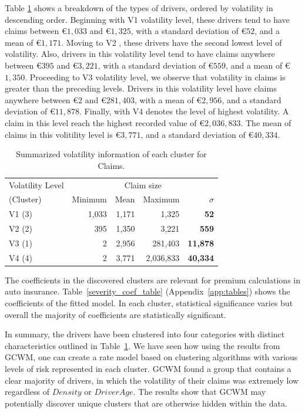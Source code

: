 \documentclass[12pt,letterpaper]{article}
\numberwithin{equation}{section}
\numberwithin{equation}{section}
\numberwithin{equation}{section}
\begin{document}
Table \ref{table:volSev} shows a breakdown of the types of drivers, ordered by volatility in descending order. Beginning with V1 volatility level, these drivers tend to have claims between \euro$1,033$ and  \euro$1,325$, with a standard deviation of  \euro$52$, and a mean of  \euro$1,171$. Moving to V2 , these drivers have the second lowest level of volatility. Also, drivers in this volatility level tend to have claims anywhere between  \euro$395$ and  \euro$3,221$, with a standard deviation of  \euro$559$, and a mean of  \euro$1,350$.  Proceeding to V3 volatility level, we observe that volatility in claims is greater than the preceding levels. Drivers in this volatility level have claims anywhere between  \euro$2$ and \euro$281,403$, with a mean of  \euro$2,956$, and a standard deviation of  \euro$11,878$. Finally, with V4 denotes the level of highest volatility. A claim in this level reach the highest recorded value of  \euro$2,036,833$. The mean of  claims in this volitility level is \euro$3,771$, and a standard deviation of  \euro$40,334$. 
\begin{table}[!htb]
\centering
\caption{Summarized volatility information of each cluster for Claims.}
\label{table:volSev}
\begin{tabular}{l|rrrr}
\hline
Volatility Level     & \multicolumn{4}{c}{Claim size}   \\ 
 (Cluster)     & Minimum & Mean  & Maximum & $\sigma$    \\
\hline
V1 (3) & 1,033 & 1,171 & 1,325 & \textbf{52} \\
V2 (2) & 395 & 1,350 & 3,221 & \textbf{559} \\
V3 (1) & 2 & 2,956 & 281,403 & \textbf{11,878 }\\
V4 (4) & 2 & 3,771 & 2,036,833 & \textbf{ 40,334 } \\ 
\hline
\end{tabular}
\end{table}


The coefficients in the discovered clusters are relevant for premium calculations in auto insurance. Table~\ref{severity_coef_table} (Appendix~\ref{app:tables}) shows the coefficients of the fitted model. In each cluster, statistical significance varies but overall the majority of coefficients are statistically significant.

In summary, the drivers have been clustered into four categories with distinct characteristics outlined in Table~\ref{table:volSev}. We have seen how using the results from GCWM, one can create a rate model based on clustering algorithms with various levels of risk represented in each cluster. GCWM found a group that contains a clear majority of drivers, in which the volatility of their claims was extremely low regardless of $Density$ or $DriverAge$. The results show that GCWM may potentially discover unique clusters that are otherwise hidden within the data.
\end{document}
